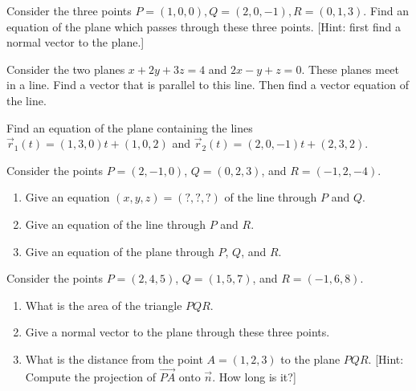\begin{problem}  
%
Consider the three points $P=(1,0,0), Q=(2,0,-1), R=(0,1,3)$. Find an equation of the plane which passes through these three points.  [Hint: first find a normal vector to the plane.]
\end{problem}

\begin{problem}  
%
Consider the two planes $x+2y+3z=4$ and $2x-y+z=0$.  These planes meet in a line.  Find a vector that is parallel to this line.  Then find a vector equation of the line.
\end{problem}

\begin{problem}\label{plane equation 2 lines}
%
Find an equation of the plane containing the lines $\vec r_1(t)=(1,3,0)t+(1,0,2)$ and $\vec r_2(t)=(2,0,-1)t+(2,3,2)$.
\end{problem}


\begin{problem}
 Consider the points $P=(2,-1,0)$, $Q=(0,2,3)$, and $R=(-1,2,-4)$.  
\begin{enumerate}
 \item Give an equation $(x,y,z)=(?,?,?)$ of the line through $P$ and $Q$.
 \item Give an equation of the line through $P$ and $R$.
 \item Give an equation of the plane through $P$, $Q$, and $R$. 
\end{enumerate}
\end{problem}

\begin{problem} 
%
 Consider the points $P=(2,4,5)$, $Q=(1,5,7)$, and $R=(-1,6,8)$.
\begin{enumerate}
 \item What is the area of the triangle $PQR$. 
 \item Give a normal vector to the plane through these three points.
 \item What is the distance from the point $A=(1,2,3)$ to the plane $PQR$.  [Hint: Compute the projection of $\vec {PA}$ onto $\vec n$.  How long is it?] 
\end{enumerate}

 
\end{problem}


